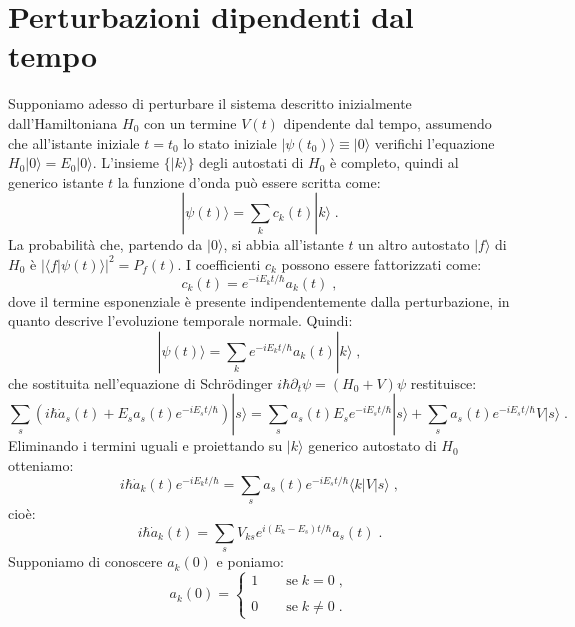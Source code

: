 \documentclass[12pt,a4paper]{report}
\theoremstyle{definition}
\numberwithin{equation}{section}
\newcommand{\bra}{\langle}
\newcommand{\ket}{\rangle}
\newcommand{\Sch}{Schrödinger}
\begin{document}
\section{Perturbazioni dipendenti dal tempo}
Supponiamo adesso di perturbare il sistema descritto inizialmente dall'Hamiltoniana $H_0$ con un termine $V(t)$ dipendente dal tempo, assumendo che all'istante iniziale $t=t_0$ lo stato iniziale $|\psi(t_0)\ket\equiv |0\ket$ verifichi l'equazione $H_0|0\ket=E_0|0\ket$. L'insieme $\{|k\ket\}$ degli autostati di $H_0$ è completo, quindi al generico istante $t$ la funzione d'onda può essere scritta come:
\begin{equation}
|\psi(t)\ket=\sum_k c_k(t)|k\ket\;.
\end{equation}
La probabilità che, partendo da $|0\ket$, si abbia all'istante $t$ un altro autostato $|f\ket$ di $H_0$ è $|\bra f|\psi(t)\ket|^2=P_f(t)$. I coefficienti $c_k$ possono essere fattorizzati come:
\begin{equation}
c_k(t)=e^{-iE_kt/\hbar}a_k(t)\;,
\end{equation}
dove il termine esponenziale è presente indipendentemente dalla perturbazione, in quanto descrive l'evoluzione temporale normale. Quindi:
\begin{equation}
|\psi(t)\ket=\sum_k e^{-iE_kt/\hbar}a_k(t)|k\ket\;,
\end{equation}
che sostituita nell'equazione di \Sch\; $i\hbar\partial_t\psi=(H_0+V)\psi$ restituisce:
\begin{equation}
\sum_s(i\hbar\dot{a}_s(t)+E_sa_s(t)e^{-iE_st/\hbar})|s\ket=\sum_s a_s(t)E_se^{-iE_st/\hbar}|s\ket+\sum_sa_s(t)e^{-iE_st/\hbar}V|s\ket\;.
\end{equation}
Eliminando i termini uguali e proiettando su $|k\ket$ generico autostato di $H_0$ otteniamo:
\begin{equation*}
i\hbar\dot{a}_k(t)e^{-iE_kt/\hbar}=\sum_s a_s(t)e^{-iE_st/\hbar}\bra k|V|s\ket\;,
\end{equation*}
cioè:
\begin{equation}
i\hbar \dot{a}_k(t)=\sum_s V_{ks}e^{i(E_k-E_s)t/\hbar}a_s(t)\;.
\end{equation}
Supponiamo di conoscere $a_k(0)$ e poniamo:
\begin{equation}
a_k(0)=\begin{cases}
1\qquad \mbox{se}\;k=0\;, \\
\\
0\qquad \mbox{se}\;k\ne 0\;.
\end{cases}
\end{equation}
\end{document}
